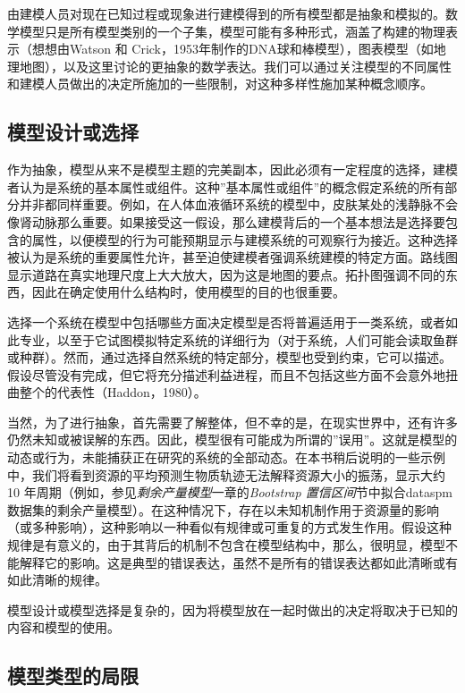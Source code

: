 \documentclass[
  lang=cn,
  11pt,
  scheme=chinese,
  chinesefont=nofont,
  citestyle=gb7714-2015,
  bibstyle=gb7714-2015]{elegantbook}
\begin{document}
由建模人员对现在已知过程或现象进行建模得到的所有模型都是抽象和模拟的。数学模型只是所有模型类别的一个子集，模型可能有多种形式，涵盖了构建的物理表示（想想由Watson 和 Crick，1953年制作的DNA球和棒模型），图表模型（如地理地图），以及这里讨论的更抽象的数学表达。我们可以通过关注模型的不同属性和建模人员做出的决定所施加的一些限制，对这种多样性施加某种概念顺序。

\subsection{模型设计或选择}\label{ux6a21ux578bux8bbeux8ba1ux6216ux9009ux62e9}

作为抽象，模型从来不是模型主题的完美副本，因此必须有一定程度的选择，建模者认为是系统的基本属性或组件。这种''基本属性或组件''的概念假定系统的所有部分并非都同样重要。例如，在人体血液循环系统的模型中，皮肤某处的浅静脉不会像肾动脉那么重要。如果接受这一假设，那么建模背后的一个基本想法是选择要包含的属性，以便模型的行为可能预期显示与建模系统的可观察行为接近。这种选择被认为是系统的重要属性允许，甚至迫使建模者强调系统建模的特定方面。路线图显示道路在真实地理尺度上大大放大，因为这是地图的要点。拓扑图强调不同的东西，因此在确定使用什么结构时，使用模型的目的也很重要。

选择一个系统在模型中包括哪些方面决定模型是否将普遍适用于一类系统，或者如此专业，以至于它试图模拟特定系统的详细行为（对于系统，人们可能会读取鱼群或种群）。然而，通过选择自然系统的特定部分，模型也受到约束，它可以描述。假设尽管没有完成，但它将充分描述利益进程，而且不包括这些方面不会意外地扭曲整个的代表性（Haddon，1980）。

当然，为了进行抽象，首先需要了解整体，但不幸的是，在现实世界中，还有许多仍然未知或被误解的东西。因此，模型很有可能成为所谓的''误用''。这就是模型的动态或行为，未能捕获正在研究的系统的全部动态。在本书稍后说明的一些示例中，我们将看到资源的平均预测生物质轨迹无法解释资源大小的振荡，显示大约 10 年周期（例如，参见\emph{剩余产量模型}一章的\emph{Bootstrap 置信区间}节中拟合dataspm数据集的剩余产量模型）。在这种情况下，存在以未知机制作用于资源量的影响（或多种影响），这种影响以一种看似有规律或可重复的方式发生作用。假设这种规律是有意义的，由于其背后的机制不包含在模型结构中，那么，很明显，模型不能解释它的影响。这是典型的错误表达，虽然不是所有的错误表达都如此清晰或有如此清晰的规律。

模型设计或模型选择是复杂的，因为将模型放在一起时做出的决定将取决于已知的内容和模型的使用。

\subsection{模型类型的局限}\label{ux6a21ux578bux7c7bux578bux7684ux5c40ux9650}
\end{document}

